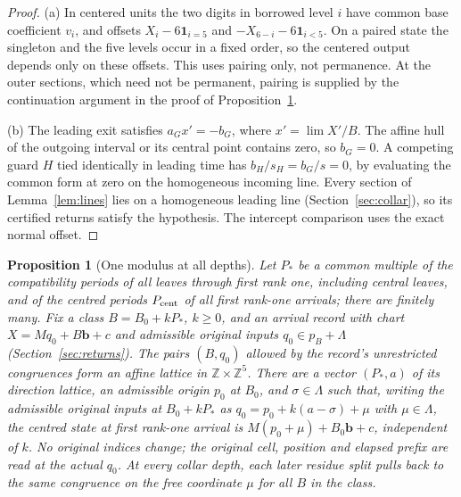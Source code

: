 \documentclass[11pt,reqno]{amsart}
\newtheorem{proposition}[theorem]{Proposition}
\theoremstyle{definition}
\newcommand{\Z}{\mathbb Z}
\newcommand{\one}{\mathbf 1}
\begin{document}
\begin{proof}
(a) In centered units the two digits in borrowed level \(i\) have
common base coefficient \(v_i\), and offsets
\(X_i-6\one_{i=5}\) and \(-X_{6-i}-6\one_{i<5}\). On a paired state the
singleton and the five levels occur in a fixed order, so the centered
output depends only on these offsets. This uses pairing only, not
permanence. At the outer sections, which need not be permanent, pairing
is supplied by the continuation argument in the proof of
Proposition~\ref{prop:onemod}.

(b) The leading exit satisfies \(a_G x'=-b_G\), where
\(x'=\lim X'/B\). The affine hull of the outgoing interval or its
central point contains zero, so \(b_G=0\). A competing guard \(H\)
tied identically in leading time has \(b_H/s_H=b_G/s=0\), by evaluating
the common form at zero on the homogeneous incoming line. Every section of
Lemma~\ref{lem:lines} lies on a homogeneous leading line
(Section~\ref{sec:collar}), so its certified returns satisfy the hypothesis. The intercept
comparison uses the exact normal offset.
\end{proof}

\begin{proposition}[One modulus at all depths]\label{prop:onemod}
Let \(P_*\) be a common multiple of the compatibility periods of all leaves
through first rank one, including central leaves, and of the centred
periods \(P_{\rm cent}\) of all first rank-one arrivals; there are finitely
many. Fix a class \(B=B_0+kP_*\), \(k\ge0\), and an arrival record with chart
\(X=Mq_0+B\mathbf b+c\) and admissible original inputs \(q_0\in p_B+\Lambda\)
(Section~\ref{sec:returns}). The pairs \((B,q_0)\) allowed by the record's
unrestricted congruences form an affine lattice in \(\Z\times\Z^5\). There
are a vector \((P_*,a)\) of its direction lattice, an admissible origin
\(p_0\) at \(B_0\), and \(\sigma\in\Lambda\) such that, writing the
admissible original inputs at \(B_0+kP_*\) as \(q_0=p_0+k(a-\sigma)+\mu\)
with \(\mu\in\Lambda\), the centred state at first rank-one arrival is
\(M(p_0+\mu)+B_0\mathbf b+c\), independent of \(k\). No original indices change; the original cell,
position and elapsed prefix are read at the actual \(q_0\). At every collar
depth, each later residue split pulls back to the same congruence on the
free coordinate \(\mu\) for all \(B\) in the class.
\end{proposition}
\end{document}
